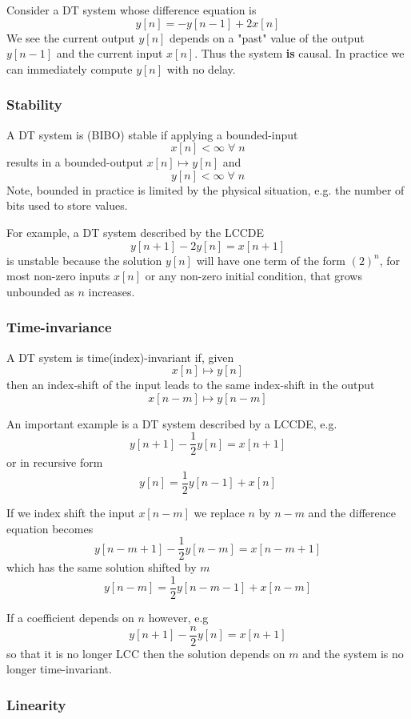 \begin{example}
Consider a DT system whose difference equation is
\[
y[n] = -y[n-1] + 2x[n]
\]
We see the current output $y[n]$ depends on a "past" value of the output $y[n-1]$ and the current input $x[n]$. Thus the system \textbf{is} causal. In practice we can immediately compute $y[n]$ with no delay. 
\end{example}

\subsubsection{Stability}

A DT system is (BIBO) stable if applying a bounded-input
\[
x[n] < \infty \; \forall \; n
\]
results in a bounded-output $x[n] \mapsto y[n]$ and 
\[
y[n] < \infty \; \forall \; n
\]
Note, bounded in practice is limited by the physical situation, e.g. the number of bits used to store values.

For example, a DT system described by the LCCDE
\[
y[n+1] - 2 y[n] = x[n+1]
\]
is unstable because the solution $y[n]$ will have one term of the form $\left( 2\right)^n$, for most non-zero inputs $x[n]$ or any non-zero initial condition, that grows unbounded as $n$ increases.

\subsubsection{Time-invariance}
A DT system is time(index)-invariant if, given
\[
x[n] \mapsto y[n]
\]
then an index-shift of the input leads to the same index-shift in the output
\[
x[n-m] \mapsto y[n-m]
\]

An important example is a DT system described by a LCCDE, e.g.
\[
y[n+1] - \frac{1}{2} y[n] = x[n+1]
\]
or in recursive form
\[
y[n] = \frac{1}{2} y[n-1] + x[n]
\]

If we index shift the input $x[n - m]$ we replace $n$ by $n-m$ and the difference equation becomes
\[
y[n-m+1] - \frac{1}{2} y[n-m] = x[n-m+1]
\]
which has the same solution shifted by $m$
\[
y[n-m] = \frac{1}{2} y[n-m -1] + x[n-m]
\]

If a coefficient depends on $n$ however, e.g
\[
y[n+1] - \frac{n}{2} y[n] = x[n+1]
\]
so that it is no longer LCC then the solution depends on $m$ and the system is no longer time-invariant.

\subsubsection{Linearity}

